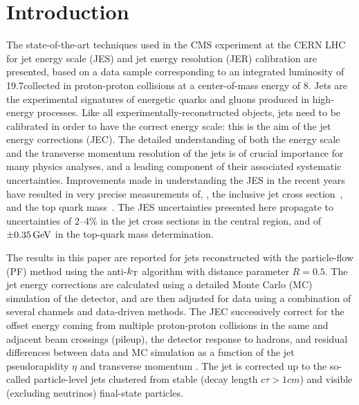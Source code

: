 \documentclass[11pt,twoside,a4paper,cmspaper,final,collab]{cms-tdr}
\begin{document}

\maketitle
\tableofcontents


\section{Introduction}

The state-of-the-art techniques used in the CMS experiment at the CERN LHC for jet energy scale (JES) and jet energy resolution (JER) calibration are presented,
based on a data sample corresponding to an integrated luminosity of 19.7\fbinv collected in proton-proton collisions at a center-of-mass energy of 8\TeV.
Jets are the experimental signatures of energetic quarks and gluons produced in high-energy processes.
Like all experimentally-reconstructed objects, jets need to be calibrated in order to have the correct energy scale: this is the aim of the jet energy corrections (JEC). The detailed understanding of both the energy scale and the transverse momentum resolution of the jets is of crucial importance for many physics analyses, and a leading component of their associated systematic uncertainties. Improvements made in understanding the JES in the recent years have resulted in very precise measurements of, \eg, the inclusive jet cross section~\cite{Chatrchyan:2012bja,CMS:2011ab,Chatrchyan:2011qta,
Chatrchyan:2014gia,Khachatryan:2015xwa},
and the top quark mass~\cite{Chatrchyan:2013xza,Chatrchyan:2013haa,Chatrchyan:2012cz,Khachatryan:2015hba}.
The JES uncertainties presented here propagate to uncertainties of 2--4\% in the jet
cross sections in the central region, and of $\pm 0.35\,\text{Ge\hspace{-.08em}V}$ in the top-quark mass determination.

The results in this paper are reported for jets reconstructed with the particle-flow (PF) method \cite{CMS-PAS-PFT-09-001, CMS-PAS-PFT-10-001} using the anti-$k_{\mathrm{T}}$ algorithm \cite{Cacciari:2008gp} with distance parameter $R=0.5$.
The jet energy corrections are calculated using a detailed Monte Carlo (MC) simulation of the detector, and are then adjusted for data using a combination of several channels and data-driven methods. The JEC successively correct for the offset energy coming from multiple proton-proton collisions in the same and adjacent beam crossings (pileup), the detector response to hadrons, and residual differences between data and MC simulation as a function of the jet pseudorapidity $\eta$ and transverse momentum \pt.
The jet \pt is corrected up to the so-called particle-level jets clustered from stable (decay length $c\tau>1\unit{cm}$) and visible (excluding neutrinos) final-state particles.
\end{document}

